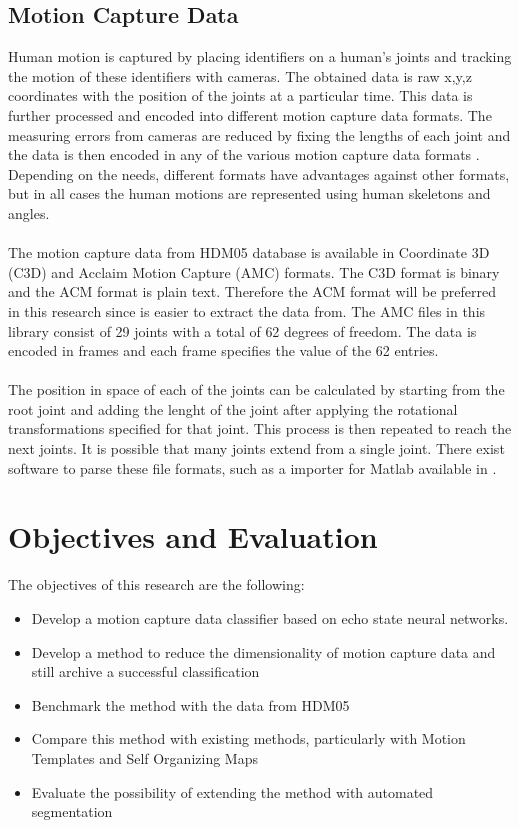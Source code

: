 \documentclass[10pt]{article}
\begin{document}
\subsection{Motion Capture Data}
Human motion is captured by placing identifiers on a human's joints and tracking the motion of these identifiers with cameras. The obtained data is raw x,y,z coordinates with the position of the joints at a particular time. This data is further processed and encoded into different motion capture data formats. The measuring errors from cameras are reduced by fixing the lengths of each joint and the data is then encoded in any of the various motion capture data formats \cite{MocapFormats}. Depending on the needs, different formats have advantages against other formats, but in all cases the human motions are represented using human skeletons and angles.
\\\\
The motion capture data from HDM05 database\cite{MotionTemplatesURL} is available in Coordinate 3D (C3D) and Acclaim Motion Capture (AMC) formats. The C3D format is binary and the ACM format is plain text. Therefore the ACM format will be preferred in this research since is easier to extract the data from. The AMC files in this library consist of 29 joints with a total of 62 degrees of freedom. The data is encoded in frames and each frame specifies the value of the 62 entries. 
\\\\
The position in space of each of the joints can be calculated by starting from the root joint and adding the lenght of the joint after applying the rotational transformations specified for that joint. This process is then repeated to reach the next joints. It is possible that many joints extend from a single joint. There exist software to parse these file formats, such as a importer for Matlab available in \cite{MotionTemplatesURL}.

\section{Objectives and Evaluation}

The objectives of this research are the following:
\begin{itemize}
\item Develop a motion capture data classifier based on echo state neural networks.
\item Develop a method to reduce the dimensionality of motion capture data and still archive a successful classification
\item Benchmark the method with the data from HDM05 \cite{MotionTemplatesURL}
\item Compare this method with existing methods, particularly with Motion Templates\cite{MotionTemplates} and Self Organizing Maps\cite{EfficientMotionIndexing}
\item Evaluate the possibility of extending the method with automated segmentation
\end{itemize}
\end{document}
